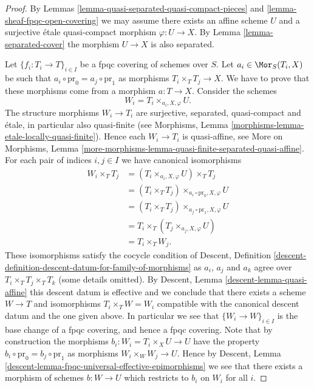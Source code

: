 \begin{proof}
By
Lemmas \ref{lemma-quasi-separated-quasi-compact-pieces}
and \ref{lemma-sheaf-fpqc-open-covering}
we may assume there exists an affine scheme $U$ and a
surjective \'etale quasi-compact morphism $\varphi : U \to X$.
By
Lemma \ref{lemma-separated-cover}
the morphism $U \to X$ is also separated.

\medskip\noindent
Let $\{f_i : T_i \to T\}_{i \in I}$ be a fpqc covering of schemes over $S$.
Let $a_i \in \Mor_S(T_i, X)$ be such that
$a_i \circ \text{pr}_0 = a_j \circ \text{pr}_1$ as morphisms
$T_i \times_T T_j \to X$. We have to prove that these morphisms
come from a morphism $a : T \to X$. Consider the schemes
$$
W_i = T_i \times_{a_i, X, \varphi} U.
$$
The structure morphisms $W_i \to T_i$ are surjective, separated, quasi-compact
and \'etale, in particular also quasi-finite (see
Morphisms, Lemma \ref{morphisms-lemma-etale-locally-quasi-finite}).
Hence each $W_i \to T_i$ is quasi-affine, see
More on Morphisms,
Lemma \ref{more-morphisms-lemma-quasi-finite-separated-quasi-affine}.
For each pair of indices $i, j \in I$ we have canonical isomorphisms
\begin{align*}
W_i \times_T T_j & =
(T_i \times_{a_i, X, \varphi} U) \times_T T_j \\
& =
(T_i \times_T T_j) \times_{a_i \circ \text{pr}_0, X, \varphi} U \\
& =
(T_i \times_T T_j) \times_{a_j \circ \text{pr}_1, X, \varphi} U \\
& =
T_i \times_T (T_j \times_{a_j, X, \varphi} U) \\
& =
T_i \times_T W_j.
\end{align*}
These isomorphisms satisfy the cocycle condition of
Descent,
Definition \ref{descent-definition-descent-datum-for-family-of-morphisms}
as $a_i$, $a_j$ and $a_k$ agree over $T_i \times_T T_j \times_T T_k$
(some details omitted). By
Descent, Lemma \ref{descent-lemma-quasi-affine}
this descent datum is effective and
we conclude that there exists a scheme $W \to T$ and isomorphisms
$T_i \times_T W = W_i$ compatible with the canonical descent datum
and the one given above. In particular we see that
$\{W_i \to W\}_{i \in I}$ is the base change of a fpqc covering,
and hence a fpqc covering. Note that by construction the
morphisms $b_i : W_i = T_i \times_X U \to U$ have the property
$b_i \circ \text{pr}_0 = b_j \circ \text{pr}_1$ as morphisms
$W_i \times_W W_j \to U$. Hence by
Descent, Lemma \ref{descent-lemma-fpqc-universal-effective-epimorphisms}
we see that there exists a morphism of schemes $b : W \to U$
which restricts to $b_i$ on $W_i$ for all $i$.


\end{proof}
